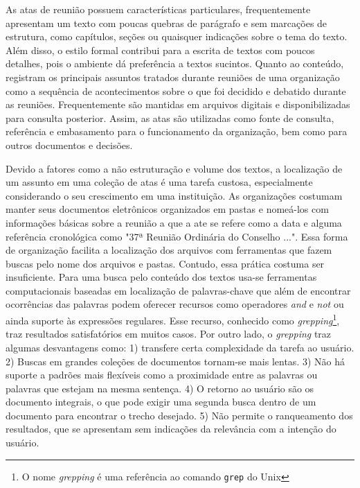

As atas de reunião possuem características particulares, frequentemente apresentam um texto com poucas quebras de parágrafo e sem marcações de estrutura, como capítulos, seções ou quaisquer indicações sobre o tema do texto. Além disso, o estilo formal contribui para a escrita de textos com poucos detalhes, pois o ambiente dá preferência a textos sucintos. Quanto ao conteúdo, registram os principais assuntos tratados durante reuniões de uma organização como a sequência de acontecimentos sobre o que foi decidido e debatido durante as reuniões. Frequentemente são mantidas em arquivos digitais e disponibilizadas para consulta posterior. Assim, as atas são utilizadas como fonte de consulta, referência e embasamento para o funcionamento da organização, bem como para outros documentos e decisões.






Devido a fatores como a não estruturação e volume dos textos, a localização de um assunto em uma coleção de atas é uma tarefa custosa, especialmente considerando o seu crescimento em uma instituição. 
As organizações costumam manter seus documentos eletrônicos organizados em pastas e nomeá-los com informações básicas sobre a reunião a que a ate se refere como a data e alguma referência cronológica como "37ª Reunião Ordinária do Conselho ...". Essa forma de organização facilita a localização dos arquivos com ferramentas que fazem buscas pelo nome dos arquivos e pastas. Contudo, essa prática costuma ser insuficiente. Para uma busca pelo conteúdo dos textos usa-se ferramentas computacionais baseadas em localização de palavras-chave que além de encontrar ocorrências das palavras podem oferecer recursos como operadores \textit{and} e \textit{not} ou ainda suporte às expressões regulares. Esse recurso, conhecido como \textit{grepping}\footnote{O nome \textit{grepping} é uma referência ao comando \texttt{grep} do Unix}, traz resultados satisfatórios em muitos casos. Por outro lado, o \textit{grepping} traz algumas desvantagens como: 1) transfere certa complexidade da tarefa ao usuário. 2) Buscas em grandes coleções de documentos tornam-se mais lentas. 3) Não há suporte a padrões mais flexíveis como a proximidade entre as palavras ou palavras que estejam na mesma sentença. 4) O retorno ao usuário são os documento integrais, o que pode exigir uma segunda busca dentro de um documento para encontrar o trecho desejado. 5) Não permite o ranqueamento dos resultados, que se apresentam sem indicações da relevância com a intenção do usuário.


